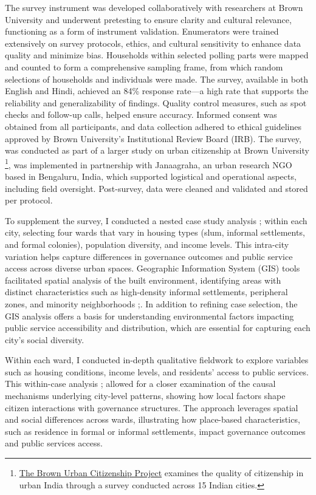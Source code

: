 The survey instrument was developed collaboratively with researchers at Brown University and underwent pretesting to ensure clarity and cultural relevance, functioning as a form of instrument validation. Enumerators were trained extensively on survey protocols, ethics, and cultural sensitivity to enhance data quality and minimize bias. Households within selected polling parts were mapped and counted to form a comprehensive sampling frame, from which random selections of households and individuals were made. The survey, available in both English and Hindi, achieved an 84\% response rate—a high rate that supports the reliability and generalizability of findings. Quality control measures, such as spot checks and follow-up calls, helped ensure accuracy. Informed consent was obtained from all participants, and data collection adhered to ethical guidelines approved by Brown University's Institutional Review Board (IRB). The survey, was conducted as part of a larger study on urban citizenship at Brown University \footnote{\href{https://watson.brown.edu/southasia/research}{The Brown Urban Citizenship Project} examines the quality of citizenship in urban India through a survey conducted across 15 Indian cities.}, was implemented in partnership with Janaagraha, an urban research NGO based in Bengaluru, India, which supported logistical and operational aspects, including field oversight. Post-survey, data were cleaned and validated and stored per protocol.

To supplement the survey, I conducted a nested case study analysis \citep{lieberman_nested_2005};\citep{gerring_case_2006} within each city, selecting four wards that vary in housing types (slum, informal settlements, and formal colonies), population diversity, and income levels. This intra-city variation helps capture differences in governance outcomes and public service access across diverse urban spaces. Geographic Information System (GIS) tools facilitated spatial analysis of the built environment, identifying areas with distinct characteristics such as high-density informal settlements, peripheral zones, and minority neighborhoods \citep{goodchild_spatially_2004};\citep{curtis_spatial_2012}. In addition to refining case selection, the GIS analysis offers a basis for understanding environmental factors impacting public service accessibility and distribution, which are essential for capturing each city’s social diversity.

Within each ward, I conducted in-depth qualitative fieldwork to explore variables such as housing conditions, income levels, and residents’ access to public services. This within-case analysis
\citep{george_case_2005}; \citep{mahoney_tale_2006}
 allowed for a closer examination of the causal mechanisms underlying city-level patterns, showing how local factors shape citizen interactions with governance structures. The approach leverages spatial and social differences across wards, illustrating how place-based characteristics, such as residence in formal or informal settlements, impact governance outcomes and public services access.

